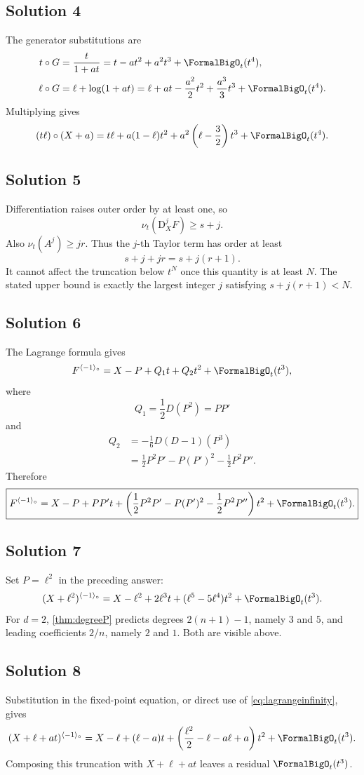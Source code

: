 \documentclass[11pt,oneside,openany]{book}
\newcommand{\ordt}{\nu_t}
\newcommand{\compose}{\mathbin{\circ}}
\newcommand{\rev}{^{\langle-1\rangle_{\circ}}}
\newcommand{\D}{\mathrm{D}}
\begin{document}
\subsection*{Solution 4}
The generator substitutions are
\begin{align*}
 t\compose G&=\frac{t}{1+at}
 =t-at^2+a^2t^3+\FormalBigO_t(t^4),\\
 \ell\compose G&=\ell+\log(1+at)
 =\ell+at-\frac{a^2}{2}t^2+\frac{a^3}{3}t^3
 +\FormalBigO_t(t^4).
\end{align*}
Multiplying gives
\[
 (t\ell)\compose(X+a)
 =t\ell+a(1-\ell)t^2
 +a^2\left(\ell-\frac32\right)t^3
 +\FormalBigO_t(t^4).
\]

\subsection*{Solution 5}
Differentiation raises outer order by at least one, so
\[
 \ordt(\D_X^jF)\geq s+j.
\]
Also \(\ordt(A^j)\geq jr\).  Thus the \(j\)-th Taylor term has order at
least
\[
 s+j+jr=s+j(r+1).
\]
It cannot affect the truncation below \(t^N\) once this quantity is at least
\(N\).  The stated upper bound is exactly the largest integer \(j\) satisfying
\(s+j(r+1)<N\).

\subsection*{Solution 6}
The Lagrange formula gives
\[
 F\rev=X-P+Q_1t+Q_2t^2+\FormalBigO_t(t^3),
\]
where
\[
 Q_1=\frac12D(P^2)=PP'
\]
and
\begin{align*}
 Q_2
 &=-\frac16D(D-1)(P^3)\\
 &=\frac12P^2P'-P(P')^2-\frac12P^2P''.
\end{align*}
Therefore
\begin{equation*}
 \boxed{
 F\rev=X-P+PP't+
 \left(\frac12P^2P'-P(P')^2-\frac12P^2P''\right)t^2
 +\FormalBigO_t(t^3).}
\end{equation*}

\subsection*{Solution 7}
Set \(P=\ell^2\) in the preceding answer:
\[
 (X+\ell^2)\rev
 =X-\ell^2+2\ell^3t+(\ell^5-5\ell^4)t^2
 +\FormalBigO_t(t^3).
\]
For \(d=2\), \cref{thm:degreeP} predicts degrees
\(2(n+1)-1\), namely \(3\) and \(5\), and leading coefficients
\(2/n\), namely \(2\) and \(1\).  Both are visible above.

\subsection*{Solution 8}
Substitution in the fixed-point equation, or direct use of
\cref{eq:lagrangeinfinity}, gives
\[
 (X+\ell+at)\rev
 =X-\ell+(\ell-a)t
 +\left(\frac{\ell^2}{2}-\ell-a\ell+a\right)t^2
 +\FormalBigO_t(t^3).
\]
Composing this truncation with \(X+\ell+at\) leaves a residual
\(\FormalBigO_t(t^3)\).
\end{document}
